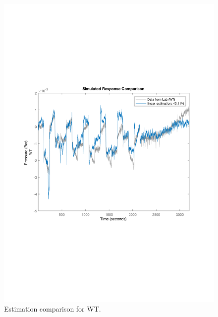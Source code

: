 \begin{figure}[H]
 \centering
\includegraphics[scale=0.45]{report/pictures/WT_estimation_1.pdf}
    \caption{Estimation comparison for WT.}
\end{figure}
